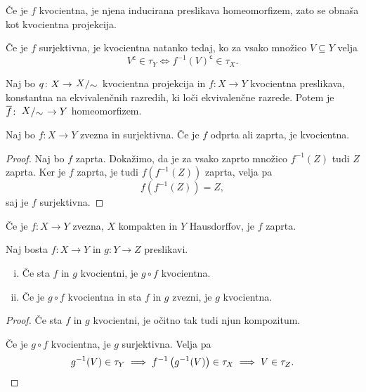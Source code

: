 \begin{opomba}
Če je $f$ kvocientna, je njena inducirana preslikava homeomorfizem,
zato se obnaša kot kvocientna projekcija.
\end{opomba}

\begin{opomba}
Če je $f$ surjektivna, je kvocientna natanko tedaj, ko za vsako
množico $V \subseteq Y$ velja
\[
V^{\mathsf{c}} \in \tau_Y \iff f^{-1}(V)^{\mathsf{c}} \in \tau_X.
\]
\end{opomba}

\begin{izrek}
Naj bo $q \colon X \to \kvoc{X}{\sim}$ kvocientna projekcija in
$f \colon X \to Y$ kvocientna preslikava, konstantna na
ekvivalenčnih razredih, ki loči ekvivalenčne razrede. Potem je
$\overline{f} \colon \kvoc{X}{\sim} \to Y$ homeomorfizem.
\end{izrek}

\obvs

\begin{lema}
Naj bo $f \colon X \to Y$ zvezna in surjektivna. Če je $f$ odprta
ali zaprta, je kvocientna.
\end{lema}

\begin{proof}
Naj bo $f$ zaprta. Dokažimo, da je za vsako zaprto množico
$f^{-1}(Z)$ tudi $Z$ zaprta. Ker je $f$ zaprta, je tudi
$f\left(f^{-1}(Z)\right) $ zaprta, velja pa
\[
f\left(f^{-1}(Z)\right) = Z,
\]
saj je $f$ surjektivna.
\end{proof}

\begin{opomba}
Če je $f \colon X \to Y$ zvezna, $X$ kompakten in $Y$ Hausdorffov,
je $f$ zaprta.
\end{opomba}

\begin{trditev}
Naj bosta $f \colon X \to Y$ in $g \colon Y \to Z$ preslikavi.

\begin{enumerate}[i)]
\item Če sta $f$ in $g$ kvocientni, je $g \circ f$ kvocientna.
\item Če je $g \circ f$ kvocientna in sta $f$ in $g$ zvezni, je $g$
kvocientna.
\end{enumerate}
\end{trditev}

\begin{proof}
Če sta $f$ in $g$ kvocientni, je očitno tak tudi njun kompozitum.

Če je $g \circ f$ kvocientna, je $g$ surjektivna. Velja pa
\[
g^{-1}(V) \in \tau_Y \implies
f^{-1}\left(g^{-1}(V)\right) \in \tau_X \implies
V \in \tau_Z. \qedhere
\]
\end{proof}
